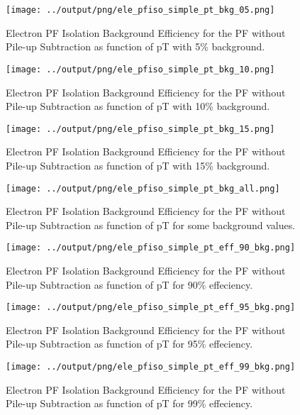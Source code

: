 \documentclass[11pt]{book}
\begin{document}
\begin{figure}[htb]
\centering
\texttt{[image: ../output/png/ele\_pfiso\_simple\_pt\_bkg\_05.png]}
\caption{Electron PF Isolation Background Efficiency for the PF without Pile-up Subtraction as function of pT with 5\% background.}
\label{fig:ele_pfiso_pt_bkg_simple_bkg_05}
\end{figure}

\begin{figure}[htb]
\centering
\texttt{[image: ../output/png/ele\_pfiso\_simple\_pt\_bkg\_10.png]}
\caption{Electron PF Isolation Background Efficiency for the PF without Pile-up Subtraction as function of pT with 10\% background.}
\label{fig:ele_pfiso_pt_bkg_simple_bkg_10}
\end{figure}

\begin{figure}[htb]
\centering
\texttt{[image: ../output/png/ele\_pfiso\_simple\_pt\_bkg\_15.png]}
\caption{Electron PF Isolation Background Efficiency for the PF without Pile-up Subtraction as function of pT with 15\% background.}
\label{fig:ele_pfiso_pt_bkg_simple_bkg_15}
\end{figure}

\begin{figure}[htb]
\centering
\texttt{[image: ../output/png/ele\_pfiso\_simple\_pt\_bkg\_all.png]}
\caption{Electron PF Isolation Background Efficiency for the PF without Pile-up Subtraction as function of pT for some background values.}
\label{fig:ele_pfiso_pt_bkg_simple_bkg_all}
\end{figure}

\begin{figure}[htb]
\centering
\texttt{[image: ../output/png/ele\_pfiso\_simple\_pt\_eff\_90\_bkg.png]}
\caption{Electron PF Isolation Background Efficiency for the PF without Pile-up Subtraction as function of pT for 90\% effeciency.}
\label{fig:ele_pfiso_pt_eff_simple_eff_90_bkg}
\end{figure}

\begin{figure}[htb]
\centering
\texttt{[image: ../output/png/ele\_pfiso\_simple\_pt\_eff\_95\_bkg.png]}
\caption{Electron PF Isolation Background Efficiency for the PF without Pile-up Subtraction as function of pT for 95\% effeciency.}
\label{fig:ele_pfiso_pt_eff_simple_eff_95_bkg}
\end{figure}

\begin{figure}[htb]
\centering
\texttt{[image: ../output/png/ele\_pfiso\_simple\_pt\_eff\_99\_bkg.png]}
\caption{Electron PF Isolation Background Efficiency for the PF without Pile-up Subtraction as function of pT for 99\% effeciency.}
\label{fig:ele_pfiso_pt_eff_simple_eff_99_bkg}
\end{figure}
\end{document}
